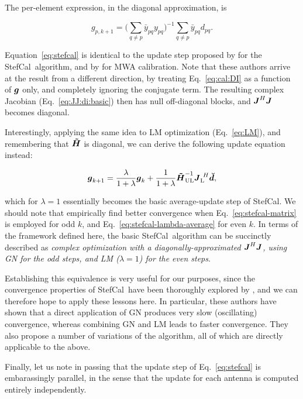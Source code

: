 \documentclass[useAMS,usenatbib]{mn2e}
\newcommand{\mat}[1]{{\bmath{#1}}}
\newcommand{\JJ}{\mat{J}} %
\newcommand{\HHa}{\mat{\tilde{H}}} %
\newcommand{\JHJ}{\JJ^H\JJ} %
\newcommand{\AUG}[1]{\bmath{\breve{#1}}}
\newcommand{\Dd}{\AUG{d}}
\newcommand{\LEFT}{\mathrm{L}}
\newcommand{\UL}{\mathrm{UL}}%
\newcommand{\StefCal}{{\sc StefCal}}
\begin{document}
The per-element expression, in the diagonal approximation, is

\begin{equation}
\label{eq:stefcal}
g_{p,k+1} = \big( \sum\limits_{q\ne p} \bar{y}_{pq} y_{pq} \big)^{-1} \sum\limits_{q\ne p} \bar{y}_{pq} d_{pq}.
\end{equation}

Equation~\ref{eq:stefcal} 
is identical to the update step proposed by \citet{Stefcal} for the \StefCal\ algorithm, and by \citet{Mitchell-RTS} for MWA calibration. Note that these authors arrive at the result from a different 
direction, by treating Eq.~\ref{eq:cal:DI} as a function of $\bmath{g}$ only, and completely ignoring the conjugate term. 
The resulting complex Jacobian (Eq.~\ref{eq:JJ:di:basic}) then has null off-diagonal blocks, and $\JJ^H\JJ$ becomes 
diagonal.

Interestingly, applying the same idea to LM optimization (Eq.~\ref{eq:LM}), and remembering that $\HHa$ is 
diagonal, we can derive the following update equation instead:

\begin{equation}
\bmath{g}_{k+1} = \frac{\lambda}{1+\lambda}\bmath{g}_k + \frac{1}{1+\lambda} \HHa_{\UL}^{-1} \JJ_\LEFT^{~H} \Dd,
\label{eq:stefcal-lambda-average}
\end{equation}

which for $\lambda=1$ essentially becomes the basic average-update step of \StefCal. We should note that \citet{Stefcal}
empirically find better convergence when Eq.~\ref{eq:stefcal-matrix} is employed for odd $k$, and 
Eq.~\ref{eq:stefcal-lambda-average} for even $k$. In terms of the framework defined here, the basic \StefCal\ algorithm 
can be succinctly described as {\em complex optimization with a 
diagonally-approximated $\JHJ$, using GN for the odd steps, and LM ($\lambda=1$) for the even steps}.

Establishing this equivalence is 
very useful for our purposes, since the convergence properties of \StefCal\ have been thoroughly explored 
by \citet{Stefcal}, and we can therefore hope to apply these lessons here. In particular, these authors have shown 
that a direct application of GN produces very slow (oscillating) convergence, whereas combining GN and LM leads to faster convergence. They also propose a number of variations of the algorithm, all of which are 
directly applicable to the above.

Finally, let us note in passing that the update step of Eq.~\ref{eq:stefcal} is embarassingly parallel, in the sense 
that the update for each antenna is computed entirely independently.
\end{document}
